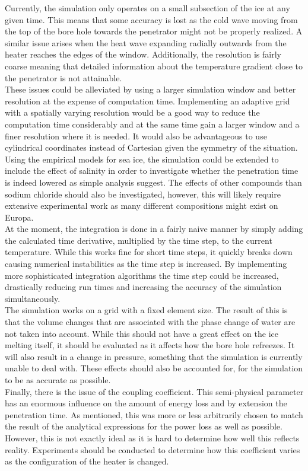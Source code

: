 \noindent
Currently, the simulation only operates on a small subsection of the ice at any given time. This means that some accuracy is lost as the cold wave moving from the top of the bore hole towards the penetrator might not be properly realized. A similar issue arises when the heat wave expanding radially outwards from the heater reaches the edges of the window. Additionally, the resolution is fairly coarse meaning that detailed information about the temperature gradient close to the penetrator is not attainable.\\
These issues could be alleviated by using a larger simulation window and better resolution at the expense of computation time. Implementing an adaptive grid with a spatially varying resolution would be a good way to reduce the computation time considerably and at the same time gain a larger window and a finer resolution where it is needed. It would also be advantageous to use cylindrical coordinates instead of Cartesian given the symmetry of the situation.\\

\noindent
Using the empirical models for sea ice, the simulation could be extended to include the effect of salinity in order to investigate whether the penetration time is indeed lowered as simple analysis suggest. The effects of other compounds than sodium chloride should also be investigated, however, this will likely require extensive experimental work as many different compositions might exist on Europa.\\

\noindent
At the moment, the integration is done in a fairly naive manner by simply adding the calculated time derivative, multiplied by the time step, to the current temperature. While this works fine for short time steps, it quickly breaks down causing numerical instabilities as the time step is increased. By implementing more sophisticated integration algorithms the time step could be increased, drastically reducing run times and increasing the accuracy of the simulation simultaneously.\\

\noindent
The simulation works on a grid with a fixed element size. The result of this is that the volume changes that are associated with the phase change of water are not taken into account. While this should not have a great effect on the ice melting itself, it should be evaluated as it affects how the bore hole refreezes. It will also result in a change in pressure, something that the simulation is currently unable to deal with. These effects should also be accounted for, for the simulation to be as accurate as possible.\\

\noindent
Finally, there is the issue of the coupling coefficient. This semi-physical parameter has an enormous influence on the amount of energy loss and by extension the penetration time. As mentioned, this was more or less arbitrarily chosen to match the result of the analytical expressions for the power loss as well as possible. However, this is not exactly ideal as it is hard to determine how well this reflects reality. Experiments should be conducted to determine how this coefficient varies as the configuration of the heater is changed.     


